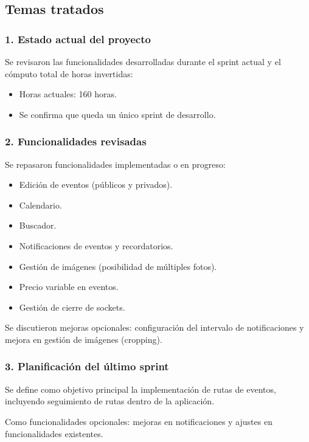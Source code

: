 \subsection*{Temas tratados}

\subsubsection*{1. Estado actual del proyecto}
Se revisaron las funcionalidades desarrolladas durante el sprint actual y el cómputo total de horas invertidas:

\begin{itemize}
    \item Horas actuales: 160 horas.
    \item Se confirma que queda un único sprint de desarrollo.
\end{itemize}

\subsubsection*{2. Funcionalidades revisadas}
Se repasaron funcionalidades implementadas o en progreso:

\begin{itemize}
    \item Edición de eventos (públicos y privados).
    \item Calendario.
    \item Buscador.
    \item Notificaciones de eventos y recordatorios.
    \item Gestión de imágenes (posibilidad de múltiples fotos).
    \item Precio variable en eventos.
    \item Gestión de cierre de sockets.
\end{itemize}

Se discutieron mejoras opcionales: configuración del intervalo de notificaciones y mejora en gestión de imágenes (cropping).

\subsubsection*{3. Planificación del último sprint}
Se define como objetivo principal la implementación de rutas de eventos, incluyendo seguimiento de rutas dentro de la aplicación.

Como funcionalidades opcionales: mejoras en notificaciones y ajustes en funcionalidades existentes.

